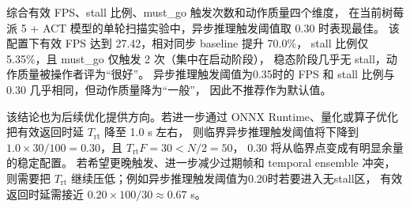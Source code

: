 综合有效 FPS、stall 比例、must\_go 触发次数和动作质量四个维度，
在当前树莓派 5 + ACT 模型的单轮扫描实验中，异步推理触发阈值取 0.30 时表现最佳。
该配置下有效 FPS 达到 27.42，相对同步 baseline 提升 70.0\%，
stall 比例仅 5.35\%，且 must\_go 仅触发 2 次（集中在启动阶段），
稳态阶段几乎无 stall，动作质量被操作者评为``很好''。
异步推理触发阈值为0.35时的 FPS 和 stall 比例与 0.30 几乎相同，但动作质量降为``一般''，
因此不推荐作为默认值。

该结论也为后续优化提供方向。若进一步通过 ONNX Runtime、量化或算子优化
把有效返回时延 $T_{\text{rt}}$ 降至 1.0 s 左右，
则临界异步推理触发阈值将下降到
$1.0\times30/100=0.30$，且 $T_{\text{rt}}F=30 < N/2=50$，
0.30 将从临界点变成有明显余量的稳定配置。
若希望更晚触发、进一步减少过期帧和 temporal ensemble 冲突，
则需要把 $T_{\text{rt}}$ 继续压低；例如异步推理触发阈值为0.20时若要进入无stall区，
有效返回时延需接近 $0.20\times100/30\approx0.67$ s。
